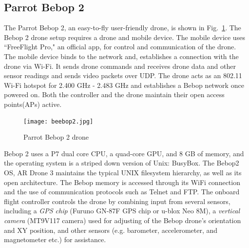 \documentclass[conference]{IEEEtran}
\begin{document}
\subsection{Parrot Bebop 2}
The Parrot Bebop 2, an easy-to-fly user-friendly drone, is shown in Fig.~\ref{fig:beebop2}. The Bebop 2 drone setup requires a drone and mobile device. 
The mobile device uses ``FreeFlight Pro," an official app, for control and communication of the drone.
The mobile device binds to the network and, establishes a connection with the drone via Wi-Fi.  It sends drone commands and 
receives drone data and other sensor readings and sends video packets over UDP. The drone acts as an 802.11 Wi-Fi hotspot for 2.400 GHz - 2.483 GHz and establishes a Bebop network once powered on.  Both the controller and the drone maintain their open access points(APs) active.

\begin{figure}[h!]
	\centering
	\texttt{[image: beebop2.jpg]}
	\caption{Parrot Bebop 2 drone}
	\label{fig:beebop2}
\end{figure}


Bebop 2 uses a P7 dual core CPU, a quad-core GPU, and 8 GB of memory, and the operating system is a striped down version of Unix: BusyBox. The Bebop2 OS, AR Drone 3 maintains the typical UNIX filesystem hierarchy, as well as its open architecture.
The Bebop memory is accessed through its WiFi connection and the use of communication protocols such as Telnet ​and FTP. 
The onboard flight controller controls the drone by combining input from several sensors, including a {\it GPS chip} (Furuno GN-87F GPS chip or u-blox Neo 8M), a {\it vertical camera} (MT9V117 camera) used for adjusting of the Bebop drone's orientation and XY position, and other sensors (e.g. barometer, accelerometer, and magnetometer etc.) for assistance.

\end{document}
